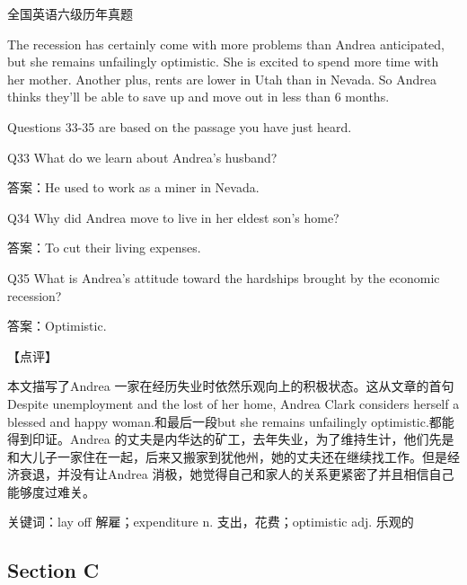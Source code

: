 \documentclass[UTF8,11pt]{ctexart}
\begin{document}
全国英语六级历年真题


The recession has certainly come with more problems than Andrea anticipated, but she remains unfailingly optimistic. She is excited to spend more time with her mother. Another plus, rents are lower in Utah than in Nevada. So Andrea thinks they’ll be able to save up and move out in less than 6 months.


Questions 33-35 are based on the passage you have just heard.


Q33 What do we learn about Andrea’s husband?


答案：He used to work as a miner in Nevada.


Q34 Why did Andrea move to live in her eldest son’s home?


答案：To cut their living expenses.


Q35 What is Andrea’s attitude toward the hardships brought by the economic recession?


答案：Optimistic.


【点评】


本文描写了Andrea 一家在经历失业时依然乐观向上的积极状态。这从文章的首句Despite unemployment and the lost of her home, Andrea Clark considers herself a blessed and happy woman.和最后一段but she remains unfailingly optimistic.都能得到印证。Andrea 的丈夫是内华达的矿工，去年失业，为了维持生计，他们先是和大儿子一家住在一起，后来又搬家到犹他州，她的丈夫还在继续找工作。但是经济衰退，并没有让Andrea 消极，她觉得自己和家人的关系更紧密了并且相信自己能够度过难关。


关键词：lay off 解雇；expenditure n. 支出，花费；optimistic adj. 乐观的


\subsection*{Section C}
\end{document}
